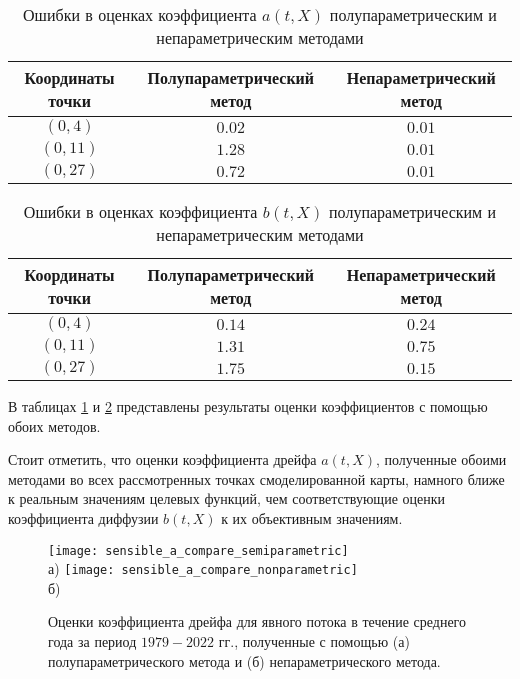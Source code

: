 \begin{table}[h!]
	\centering
	\caption{Ошибки в оценках коэффициента $a(t,X)$ полупараметрическим и непараметрическим методами}
	\begin{tabular}{|c|c|c|}
		\hline
		Координаты точки & Полупараметрический метод & Непараметрический метод \\
		\hline
		$(0, 4)$ & $0.02$ & $0.01$ \\
		$(0, 11)$ & $1.28$ & $0.01$ \\
		$(0, 27)$ & $0.72$ & $0.01$ \\
		\hline
	\end{tabular}
	\label{tab:errors_estimation_a}
\end{table}

\begin{table}[h!]
	\centering
	\caption{Ошибки в оценках коэффициента $b(t,X)$ полупараметрическим и непараметрическим методами}
	\begin{tabular}{|c|c|c|}
		\hline
		Координаты точки & Полупараметрический метод & Непараметрический метод \\
		\hline
		$(0, 4)$ & $0.14$ & $0.24$ \\
		$(0, 11)$ & $1.31$ & $0.75$ \\
		$(0, 27)$ & $1.75$ & $0.15$ \\
		\hline
	\end{tabular}
	\label{tab:errors_estimation_b}
\end{table}

В таблицах \ref{tab:errors_estimation_a} и \ref{tab:errors_estimation_b} представлены результаты оценки коэффициентов с помощью обоих методов.

Стоит отметить, что оценки коэффициента дрейфа $a(t,X)$, полученные обоими методами во всех рассмотренных точках смоделированной карты, намного ближе к реальным значениям целевых функций, чем соответствующие оценки коэффициента диффузии $b(t,X)$ к их объективным значениям.


\begin{figure}[!h]
	\centering
	\texttt{[image: sensible\_a\_compare\_semiparametric]}\\
	а)
	\texttt{[image: sensible\_a\_compare\_nonparametric]}\\
	б)
	\caption{Оценки коэффициента дрейфа для явного потока в течение среднего года за период $1979-2022$ гг., полученные с помощью (а) полупараметрического метода и (б) непараметрического метода.} 
	\label{fig:sensible_compare_a}
\end{figure}


